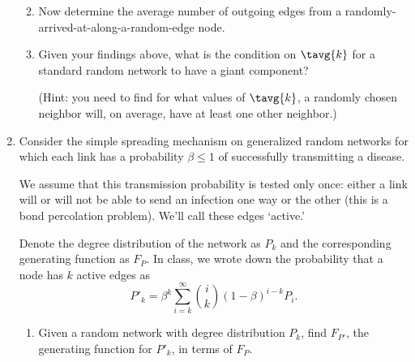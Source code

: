 \begin{enumerate}
\begin{enumerate}
      
   \solutionstart


   \solutionend

    \item
      Now determine
      the average number of outgoing edges 
      from a randomly-arrived-at-along-a-random-edge node.

      
   \solutionstart


   \solutionend

    \item
      Given your findings above, what is the condition 
      on ${\tavg{k}}$ for a standard random network
      to have a giant component?

      (Hint: you need to find for what values of ${\tavg{k}}$,
      a randomly chosen neighbor will, on average, have at least one other
      neighbor.)


      
   \solutionstart


   \solutionend

    \end{enumerate}


  \item

    Consider the simple spreading mechanism on
    generalized random networks 
    for which each link has a probability  $\beta \le 1$
    of successfully transmitting a disease.

    We assume that this transmission probability is tested
    only once: either a link will or will not be
    able to send an infection one way or the other
    (this is a bond percolation problem).
    We'll call these edges `active.'

    Denote the degree distribution of the network as $P_{k}$
    and the corresponding generating function as $F_{P}$.
    In class, we wrote down the probability that
    a node has $k$ active edges as
    $$
    P'_{k}
    =
    \beta^{k}
    \sum_{i=k}^{\infty}
    \binom{i}{k}
    (1-\beta)^{i-k}
    P_{i}.
    $$

    \begin{enumerate}
    \item 
      Given a random network with degree distribution $P_{k}$,
      find $F_{P'}$, the generating function for $P'_{k}$, 
      in terms of $F_{P}$.


\end{enumerate}
\end{enumerate}
